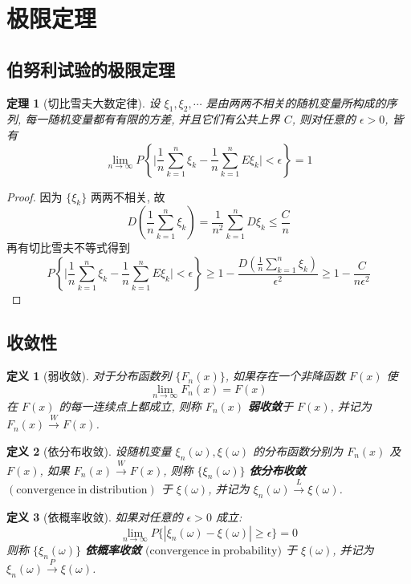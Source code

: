 \documentclass[12pt,a4paper]{article}
\newtheorem{thm}{定理}[subsection]  %
\newtheorem{definition}{定义}[subsection] %
\begin{document}
\newpage

\section{极限定理}

\subsection{伯努利试验的极限定理}
\begin{thm}[切比雪夫大数定律]
    设 $\xi_1, \xi_2, \cdots$ 是由两两不相关的随机变量所构成的序列, 每一随机变量都有有限的方差, 并且它们有公共上界 $C$, 则对任意的 $\epsilon > 0$, 皆有
    \[\lim_{n \to \infty} P\left\{ \Big| \frac{1}{n} \sum\limits_{k=1}^n \xi_k - \frac{1}{n} \sum\limits_{k=1}^n E\xi_k \Big| < \epsilon \right\} = 1 \]
\end{thm}
\begin{proof}
    因为 $\{\xi_k\}$ 两两不相关, 故 \[D\left( \frac{1}{n} \sum\limits_{k=1}^n \xi_k \right) = \frac{1}{n^2} \sum\limits_{k=1}^n D\xi_k \leq \frac{C}{n}\]
    再有切比雪夫不等式得到 \[P\left\{ \Big| \frac{1}{n} \sum\limits_{k=1}^n \xi_k - \frac{1}{n} \sum\limits_{k=1}^n E\xi_k \Big| < \epsilon \right\} \geq 1 - \frac{D(\frac{1}{n}\sum\limits_{k=1}^n \xi_k)}{\epsilon^2} \geq 1 - \frac{C}{n\epsilon^2}\]
\end{proof}

\subsection{收敛性}

\begin{definition}[弱收敛]
    对于分布函数列 $\{ F_n(x)\}$, 如果存在一个非降函数 $F(x)$ 使
    \[ \lim\limits_{n \to \infty} F_n(x) = F(x)\]
    在 $F(x)$ 的每一连续点上都成立, 则称 $F_n(x)$ \textbf{弱收敛}于 $F(x)$, 并记为 $F_n(x) \overset{W}{\to} F(x)$.
\end{definition}

\begin{definition}[依分布收敛]
    设随机变量 $\xi_n(\omega),\xi(\omega)$ 的分布函数分别为 $F_n(x)$ 及 $F(x)$, 如果 $F_n(x) \overset{W}{\to} F(x)$, 则称 $\{\xi_n(\omega)\}$ 
    \textbf{依分布收敛} $(\mathrm{convergence \ in \ distribution})$ 于 $\xi(\omega)$, 并记为 $\xi_n(\omega) \overset{L}{\to} \xi(\omega)$.
\end{definition}

\begin{definition}[依概率收敛]
    如果对任意的 $\epsilon > 0$ 成立:
    \[\lim\limits_{n \to \infty} P\{ |\xi_n(\omega) - \xi(\omega)| \geq \epsilon \} = 0\]
    则称 $\{\xi_n(\omega)\}$ \textbf{依概率收敛} $(\mathrm{convergence \ in \ probability)}$ 于 $\xi(\omega)$, 并记为 $\xi_n(\omega) \overset{P}{\to} \xi(\omega)$.
\end{definition}
\end{document}

